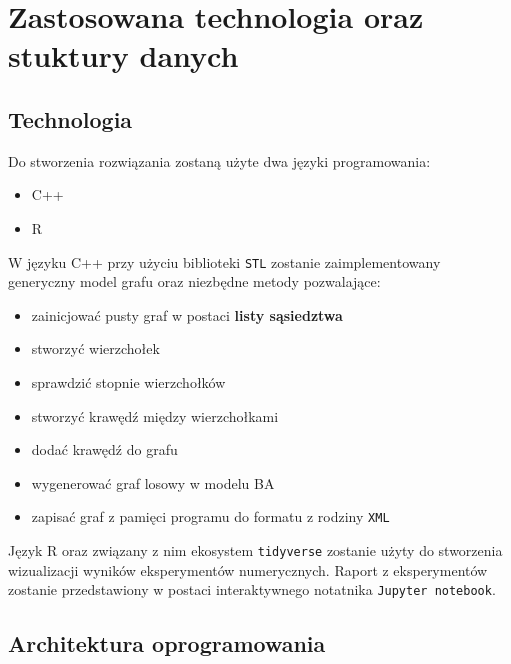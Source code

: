 \documentclass{article}
\begin{document}
\section{Zastosowana technologia oraz stuktury danych \label{s5}}
\subsection{Technologia}
	Do stworzenia rozwiązania zostaną użyte dwa języki programowania:
		\begin{itemize}
			\item C++
			\item R
		\end{itemize}
		W języku C++ przy użyciu biblioteki \texttt{STL} zostanie zaimplementowany generyczny model grafu oraz niezbędne metody pozwalające: 
		\begin{itemize}
			\item zainicjować pusty graf w postaci \textbf{listy sąsiedztwa}
			\item stworzyć wierzchołek
			\item sprawdzić stopnie wierzchołków
			\item stworzyć krawędź między wierzchołkami
			\item dodać krawędź do grafu
			\item wygenerować graf losowy w modelu BA
			\item zapisać graf z pamięci programu do formatu z rodziny \texttt{XML}
		\end{itemize}
	Język R oraz związany z nim ekosystem \texttt{tidyverse} zostanie użyty do 
	stworzenia wizualizacji wyników eksperymentów numerycznych. Raport z eksperymentów zostanie
	przedstawiony w postaci interaktywnego notatnika \texttt{Jupyter notebook}.
\subsection{Architektura oprogramowania}
\end{document}

